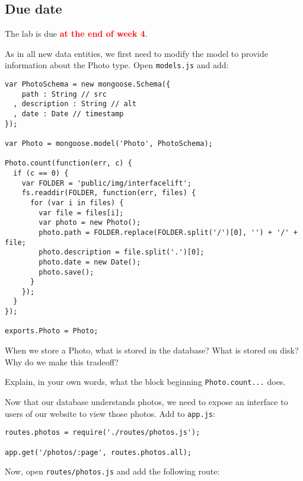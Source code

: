\documentclass{article}
\newcommand{\labduedate}{at the end of week 4}
\begin{document}
\subsection*{Due date}
The lab is due \textcolor{red}{\textbf{\labduedate}}.




As in all new data entities, we first need to modify the model to provide information about the Photo type. Open \verb!models.js! and add:

\begin{verbatim}
var PhotoSchema = new mongoose.Schema({
    path : String // src
  , description : String // alt
  , date : Date // timestamp
});

var Photo = mongoose.model('Photo', PhotoSchema);

Photo.count(function(err, c) {
  if (c == 0) {
    var FOLDER = 'public/img/interfacelift';
    fs.readdir(FOLDER, function(err, files) {
      for (var i in files) {
        var file = files[i];
        var photo = new Photo();
        photo.path = FOLDER.replace(FOLDER.split('/')[0], '') + '/' + file;
        photo.description = file.split('.')[0];
        photo.date = new Date();
        photo.save();
      }
    });
  }
});

exports.Photo = Photo;
\end{verbatim}

 When we store a Photo, what is stored in the database? What is stored on disk? Why do we make this tradeoff?

 Explain, in your own words, what the block beginning \verb!Photo.count...! does.


Now that our database understands photos, we need to expose an interface to users of our website to view those photos. Add to \verb!app.js!:

\begin{verbatim}
routes.photos = require('./routes/photos.js');

app.get('/photos/:page', routes.photos.all);
\end{verbatim}

Now, open \verb!routes/photos.js! and add the following route:
\end{document}
